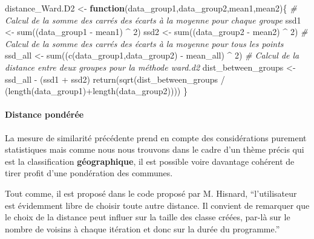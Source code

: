 \documentclass[
]{article}
\newenvironment{Shaded}{\begin{snugshade}}{\end{snugshade}}
\newcommand{\CommentTok}[1]{\textcolor[rgb]{0.56,0.35,0.01}{\textit{#1}}}
\newcommand{\ControlFlowTok}[1]{\textcolor[rgb]{0.13,0.29,0.53}{\textbf{#1}}}
\newcommand{\DecValTok}[1]{\textcolor[rgb]{0.00,0.00,0.81}{#1}}
\newcommand{\FunctionTok}[1]{\textcolor[rgb]{0.00,0.00,0.00}{#1}}
\newcommand{\NormalTok}[1]{#1}
\newcommand{\OtherTok}[1]{\textcolor[rgb]{0.56,0.35,0.01}{#1}}
\newcommand{\SpecialCharTok}[1]{\textcolor[rgb]{0.00,0.00,0.00}{#1}}
\begin{document}
\begin{Shaded}
\begin{Highlighting}[]
\NormalTok{distance\_Ward.D2 }\OtherTok{\textless{}{-}} \ControlFlowTok{function}\NormalTok{(data\_group1,data\_group2,mean1,mean2)\{}
  \CommentTok{\# Calcul de la somme des carrés des écarts à la moyenne pour chaque groupe}
\NormalTok{  ssd1 }\OtherTok{\textless{}{-}} \FunctionTok{sum}\NormalTok{((data\_group1 }\SpecialCharTok{{-}}\NormalTok{ mean1) }\SpecialCharTok{\^{}} \DecValTok{2}\NormalTok{)}
\NormalTok{  ssd2 }\OtherTok{\textless{}{-}} \FunctionTok{sum}\NormalTok{((data\_group2 }\SpecialCharTok{{-}}\NormalTok{ mean2) }\SpecialCharTok{\^{}} \DecValTok{2}\NormalTok{)}
  \CommentTok{\# Calcul de la somme des carrés des écarts à la moyenne pour tous les points}
\NormalTok{  ssd\_all }\OtherTok{\textless{}{-}} \FunctionTok{sum}\NormalTok{((}\FunctionTok{c}\NormalTok{(data\_group1,data\_group2) }\SpecialCharTok{{-}}\NormalTok{ mean\_all) }\SpecialCharTok{\^{}} \DecValTok{2}\NormalTok{)}
  \CommentTok{\# Calcul de la distance entre deux groupes pour la méthode ward.d2}
\NormalTok{  dist\_between\_groups }\OtherTok{\textless{}{-}}\NormalTok{ ssd\_all }\SpecialCharTok{{-}}\NormalTok{ (ssd1 }\SpecialCharTok{+}\NormalTok{ ssd2)}
  \FunctionTok{return}\NormalTok{(}\FunctionTok{sqrt}\NormalTok{(dist\_between\_groups }\SpecialCharTok{/}\NormalTok{ (}\FunctionTok{length}\NormalTok{(data\_group1)}\SpecialCharTok{+}\FunctionTok{length}\NormalTok{(data\_group2))))}
\NormalTok{\}}
\end{Highlighting}
\end{Shaded}

\hypertarget{distance-ponduxe9ruxe9e}{%
\paragraph{Distance pondérée}\label{distance-ponduxe9ruxe9e}}

La mesure de similarité précédente prend en compte des considérations
purement statistiques mais comme nous nous trouvons dans le cadre d'un
thème précis qui est la classification \textbf{géographique}, il est
possible voire davantage cohérent de tirer profit d'une pondération des
communes.

Tout comme, il est proposé dans le code proposé par M. Hisnard,
``l'utilisateur est évidemment libre de choisir toute autre distance. Il
convient de remarquer que le choix de la distance peut influer sur la
taille des classe créées, par-là sur le nombre de voisins à chaque
itération et donc sur la durée du programme.''
\end{document}
